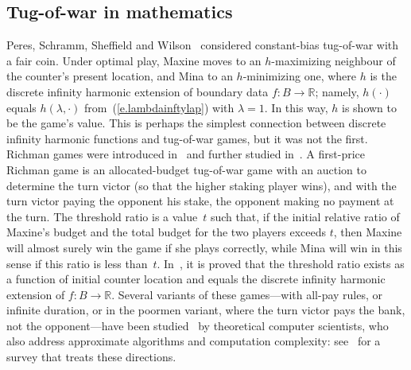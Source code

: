 \documentclass[letterpaper,11pt,oneside,reqno]{amsbook}
\newcommand{\R}{\ensuremath{\mathbb{R}}}
\numberwithin{figure}{chapter}
\theoremstyle{definition}
\theoremstyle{definition}
\theoremstyle{definition}
\theoremstyle{definition}
\theoremstyle{definition}
\begin{document}
   
 

\subsection{Tug-of-war in mathematics}


Peres, Schramm, Sheffield and Wilson~\cite{PSSW09} considered constant-bias tug-of-war with a fair coin. Under optimal play, Maxine moves to an $h$-maximizing neighbour of the counter's present location, and Mina to an $h$-minimizing one, where $h$ is the discrete infinity harmonic extension of boundary data $f:B \to \R$; namely, $h(\cdot)$ equals $h(\lambda,\cdot)$ from~(\ref{e.lambdainftylap}) with $\lambda =1$. In this way, $h$ is shown to be the game's value. This is perhaps the simplest connection between discrete infinity harmonic functions and tug-of-war games, but it was not the first. 
Richman games were introduced in~\cite{LLPU} and further studied in~\cite{LLPSU}. A first-price Richman game is an allocated-budget tug-of-war game with an auction to determine the turn victor (so that the higher staking player wins), and with the turn victor paying the opponent his stake, the opponent making no payment at the turn.  The threshold ratio is a value~$t$ such that, if the initial relative ratio of Maxine's budget and the total budget for the two players  exceeds $t$, then Maxine will almost surely win the game if she plays correctly, while Mina will win in this sense if this ratio is less than~$t$. In~\cite{LLPU}, it is proved that the threshold ratio exists as a function of initial counter location and equals the discrete infinity harmonic extension of $f:B \to \R$. Several variants of these games---with all-pay rules, or infinite duration, or in the poormen variant, where the turn victor pays the bank, not the opponent---have been studied~\cite{AJZ,AHC,AHI,AIT20} by theoretical computer scientists, who also address approximate algorithms and computation complexity: see~\cite{AH22} for a survey that treats these directions.   
\end{document}
